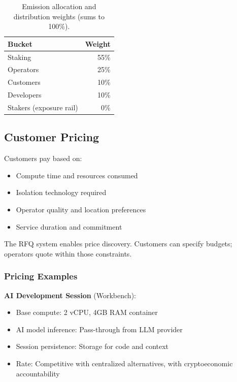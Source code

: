 \documentclass[11pt,a4paper]{article}
\begin{document}
\begin{table}[h]
\centering
\caption{Emission allocation and distribution weights (sums to 100\%).}
\label{tab:emission}
\begin{tabular}{lr}
\toprule
\textbf{Bucket} & \textbf{Weight} \\
\midrule
Staking & 55\% \\
Operators & 25\% \\
Customers & 10\% \\
Developers & 10\% \\
Stakers (exposure rail) & 0\% \\
\bottomrule
\end{tabular}
\end{table}

\subsection{Customer Pricing}

Customers pay based on:

\begin{itemize}[noitemsep]
    \item Compute time and resources consumed
    \item Isolation technology required
    \item Operator quality and location preferences
    \item Service duration and commitment
\end{itemize}

The RFQ system enables price discovery. Customers can specify budgets; operators quote within those constraints.

\subsubsection{Pricing Examples}

\textbf{AI Development Session} (Workbench):
\begin{itemize}[noitemsep]
    \item Base compute: 2 vCPU, 4GB RAM container
    \item AI model inference: Pass-through from LLM provider
    \item Session persistence: Storage for code and context
    \item Rate: Competitive with centralized alternatives, with cryptoeconomic accountability
\end{itemize}
\end{document}
